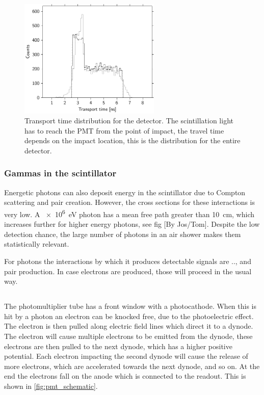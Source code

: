 \begin{figure}
    \centering
    \includegraphics[width=0.6\textwidth]
                    {plots/station/transport_time}
    \caption{Transport time distribution for the detector. The scintillation light has to reach the PMT from the point of impact, the travel time depends on the impact location, this is the distribution for the entire detector.}
    \label{fig:transport_time}
\end{figure}


\subsubsection{Gammas in the scintillator}

Energetic photons can also deposit energy in the scintillator due to Compton scattering and pair creation. However, the cross sections for these interactions is very low. A \SI{e6}{\eV} photon  has a mean free path greater than \SI{10}{\centi\meter}, which increases further for higher energy photons, see fig [By Jos/Tom]. Despite the low detection chance, the large number of photons in an air shower makes them statistically relevant.

For photons the interactions by which it produces detectable signals are .., and pair production. In case electrons are produced, those will proceed in the usual way.


\subsection{\pmt}

The photomultiplier tube has a front window with a photocathode. When this is hit by a photon an electron can be knocked free, due to the photoelectric effect. The electron is then pulled along electric field lines which direct it to a dynode. The electron will cause multiple electrons to be emitted from the dynode, these electrons are then pulled to the next dynode, which has a higher positive potential. Each electron impacting the second dynode will cause the release of more electrons, which are accelerated towards the next dynode, and so on. At the end the electrons fall on the anode which is connected to the readout. This is shown in \cref{fig:pmt_schematic}.

